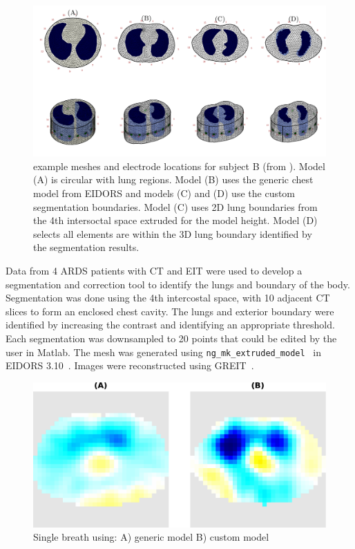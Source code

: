 \begin{figure}
	\centering
	\includegraphics[width=\textwidth]{chapter5-CT_to_mesh/imgs/fem_models_PT04.pdf}
	\caption[]{\label{fig:fem-results}%
	example meshes and electrode locations for subject B (from ).
	Model (A) is circular with lung regions. Model (B) uses the generic chest model from EIDORS 
	and models (C) and (D) use the custom segmentation boundaries. Model (C) uses 2D lung boundaries 
	from the 4th intersoctal space extruded for the model height. Model (D) selects all elements
	are within the 3D lung boundary identified by the segmentation results.
	}
\end{figure}









Data from 4 ARDS patients with CT
and EIT were used to develop a segmentation 
and correction tool to identify 
the lungs and boundary of the body.  
Segmentation was done using the 4th intercostal space, 
with 10 adjacent CT 
slices to form an enclosed chest cavity. 
The lungs
and exterior boundary were identified by increasing the contrast
and identifying an appropriate threshold.
Each segmentation was downsampled to
20 points that could be edited by the user in Matlab. The 
mesh was generated using 
\verb!ng_mk_extruded_model!~\cite{Grychtol2012} in EIDORS 
3.10~\cite{Adler2019}. Images were reconstructed 
using GREIT~\cite{Adler2009}. 


\begin{figure}
\centering
\includegraphics[width=\textwidth]{chapter5-CT_to_mesh/imgs/basic_vs_advanced_3_cropped.pdf}
\caption{\label{fig:ct_mesh_breath}%
Single breath using: A) generic model B) custom model
}
\end{figure}

